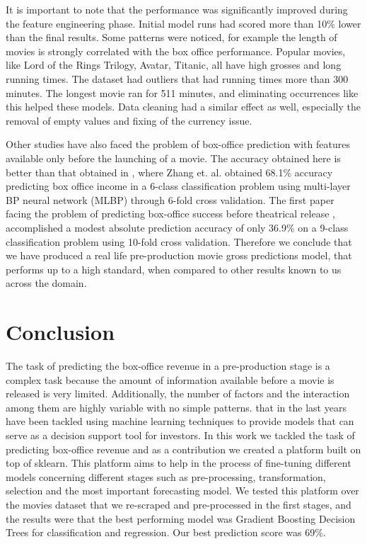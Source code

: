 It is important to note that the performance was significantly improved during the feature engineering phase. Initial model runs had scored more than 10\% lower than the final results. Some patterns were noticed, for example the length of movies is strongly correlated with the box office performance. Popular movies, like Lord of the Rings Trilogy, Avatar, Titanic, all have high grosses and long running times. The dataset had outliers that had running times more than 300 minutes. The longest movie ran for 511 minutes,  and eliminating occurrences like this helped these models. Data cleaning had a similar effect as well, especially the removal of empty values and fixing of the currency issue.

Other studies have also faced the problem of box-office prediction with features available only before the launching of a movie. The accuracy obtained here is better than that obtained in \cite{zhang2009forecasting}, where Zhang et. al. obtained 68.1\% accuracy predicting box office income in a 6-class classification problem using multi-layer BP neural network (MLBP) through 6-fold cross validation. The first paper facing the problem of predicting box-office success before theatrical release \cite{sharda2006predicting}, accomplished a modest absolute prediction accuracy of only 36.9\% on a 9-class classification problem using 10-fold cross validation. Therefore we conclude that we have produced a real life pre-production movie gross predictions model, that performs up to a high standard, when compared to other results known to us across the domain.

\section{Conclusion}
The task of predicting the box-office revenue in a pre-production stage is a complex task because the amount of information available before a movie is released is very limited. Additionally, the number of factors and the interaction among them are highly variable with no simple patterns. that in the last years have been tackled using machine learning techniques to provide models that can serve as a decision support tool for investors. In this work we tackled the task of predicting box-office revenue and as a contribution we created a platform built on top of sklearn. This platform aims to help in the process of fine-tuning different models concerning different stages such as pre-processing, transformation, selection and the most important forecasting model. We tested this platform over the movies dataset that we re-scraped and pre-processed in the first stages, and the results were that the best performing model was Gradient Boosting Decision Trees for classification and regression. Our best prediction score was 69\%. 
